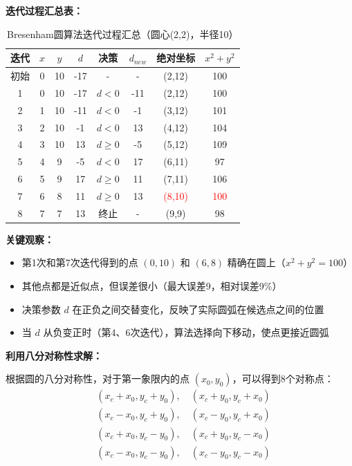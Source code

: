﻿\documentclass[12pt,a4paper]{article}
\begin{document}
\vspace{5mm}
\textbf{迭代过程汇总表：}

\begin{table}[H]
\centering
\small
\begin{tabular}{|c|c|c|c|c|c|c|c|}
\hline
\textbf{迭代} & \textbf{$x$} & \textbf{$y$} & \textbf{$d$} & \textbf{决策} & \textbf{$d_{new}$} & \textbf{绝对坐标} & \textbf{$x^2+y^2$} \\
\hline
初始 & 0 & 10 & -17 & - & - & (2,12) & 100 \\
\hline
1 & 0 & 10 & -17 & $d<0$ & -11 & (2,12) & 100 \\
\hline
2 & 1 & 10 & -11 & $d<0$ & -1 & (3,12) & 101 \\
\hline
3 & 2 & 10 & -1 & $d<0$ & 13 & (4,12) & 104 \\
\hline
4 & 3 & 10 & 13 & $d\geq 0$ & -5 & (5,12) & 109 \\
\hline
5 & 4 & 9 & -5 & $d<0$ & 17 & (6,11) & 97 \\
\hline
6 & 5 & 9 & 17 & $d\geq 0$ & 11 & (7,11) & 106 \\
\hline
7 & 6 & 8 & 11 & $d\geq 0$ & 13 & \textcolor{red}{(8,10)} & \textcolor{red}{100} \\
\hline
8 & 7 & 7 & 13 & 终止 & - & (9,9) & 98 \\
\hline
\end{tabular}
\caption{Bresenham圆算法迭代过程汇总（圆心(2,2)，半径10）}
\end{table}

\textbf{关键观察：}
\begin{itemize}
\item 第1次和第7次迭代得到的点 $(0,10)$ 和 $(6,8)$ 精确在圆上（$x^2+y^2=100$）
\item 其他点都是近似点，但误差很小（最大误差9，相对误差9\%）
\item 决策参数 $d$ 在正负之间交替变化，反映了实际圆弧在候选点之间的位置
\item 当 $d$ 从负变正时（第4、6次迭代），算法选择向下移动，使点更接近圆弧
\end{itemize}

\textbf{利用八分对称性求解：}

根据圆的八分对称性，对于第一象限内的点 $(x_0, y_0)$，可以得到8个对称点：
\begin{align*}
&(x_c + x_0, y_c + y_0), \quad (x_c + y_0, y_c + x_0) \\
&(x_c - x_0, y_c + y_0), \quad (x_c - y_0, y_c + x_0) \\
&(x_c + x_0, y_c - y_0), \quad (x_c + y_0, y_c - x_0) \\
&(x_c - x_0, y_c - y_0), \quad (x_c - y_0, y_c - x_0)
\end{align*}
\end{document}
